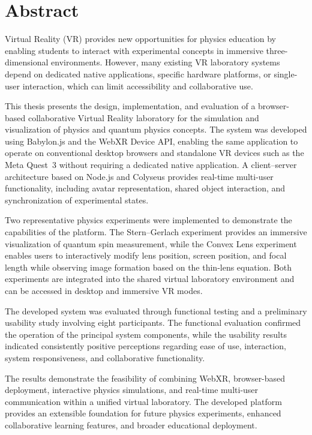 \chapter*{Abstract}

Virtual Reality (VR) provides new opportunities for physics education by enabling students to interact with experimental concepts in immersive three-dimensional environments. However, many existing VR laboratory systems depend on dedicated native applications, specific hardware platforms, or single-user interaction, which can limit accessibility and collaborative use.

This thesis presents the design, implementation, and evaluation of a browser-based collaborative Virtual Reality laboratory for the simulation and visualization of physics and quantum physics concepts. The system was developed using Babylon.js and the WebXR Device API, enabling the same application to operate on conventional desktop browsers and standalone VR devices such as the Meta Quest~3 without requiring a dedicated native application. A client--server architecture based on Node.js and Colyseus provides real-time multi-user functionality, including avatar representation, shared object interaction, and synchronization of experimental states.

Two representative physics experiments were implemented to demonstrate the capabilities of the platform. The Stern--Gerlach experiment provides an immersive visualization of quantum spin measurement, while the Convex Lens experiment enables users to interactively modify lens position, screen position, and focal length while observing image formation based on the thin-lens equation. Both experiments are integrated into the shared virtual laboratory environment and can be accessed in desktop and immersive VR modes.

The developed system was evaluated through functional testing and a preliminary usability study involving eight participants. The functional evaluation confirmed the operation of the principal system components, while the usability results indicated consistently positive perceptions regarding ease of use, interaction, system responsiveness, and collaborative functionality.

The results demonstrate the feasibility of combining WebXR, browser-based deployment, interactive physics simulations, and real-time multi-user communication within a unified virtual laboratory. The developed platform provides an extensible foundation for future physics experiments, enhanced collaborative learning features, and broader educational deployment.
